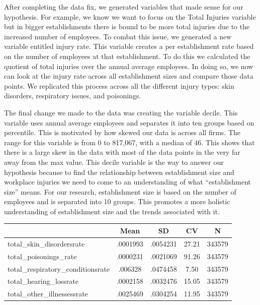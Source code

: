 \documentclass[12pt]{article}
\begin{document}
After completing the data fix, we generated variables that made sense for our hypothesis. For example, we know we want to focus on the Total Injuries variable but in bigger establishments there is bound to be more total injuries due to the increased number of employees. To combat this issue, we generated a new variable entitled injury rate. This variable creates a per establishment rate based on the number of employees at that establishment. To do this we calculated the quotient of total injuries over the annual average employees. In doing so, we now can look at the injury rate across all establishment sizes and compare those data points. We replicated this process across all the different injury types: skin disorders, respiratory issues, and poisonings. 

The final change we made to the data was creating the variable decile. This variable uses annual average employees and separates it into ten groups based on percentile. This is motivated by how skewed our data is across all firms. The range for this variable is from 0 to 817,067, with a median of 46. This shows that there is a large skew in the data with most of the data points in the very far away from the max value. This decile variable is the way to answer our hypothesis because to find the relationship between establishment size and workplace injuries we need to come to an understanding of what “establishment size” means. For our research, establishment size is based on the number of employees and is separated into 10 groups. This promotes a more holistic understanding of establishment size and the trends associated with it.



{
\def\sym#1{\ifmmode^{#1}\else\(^{#1}\)\fi}
\begin{tabular}{l*{1}{cccc}}
\hline\hline
                    &        Mean&          SD&          CV&           N\\
\hline
total\_skin\_disordersrate&    .0001993&    .0054231&       27.21&      343579\\
total\_poisonings\_rate&    .0000231&    .0021069&       91.26&      343579\\
total\_respiratory\_conditionsrate&     .006328&    .0474458&        7.50&      343579\\
total\_hearing\_lossrate&    .0002158&    .0032476&       15.05&      343579\\
total\_other\_illnessessrate&    .0025469&    .0304254&       11.95&      343579\\
\hline\hline
\end{tabular}
}
\end{document}
